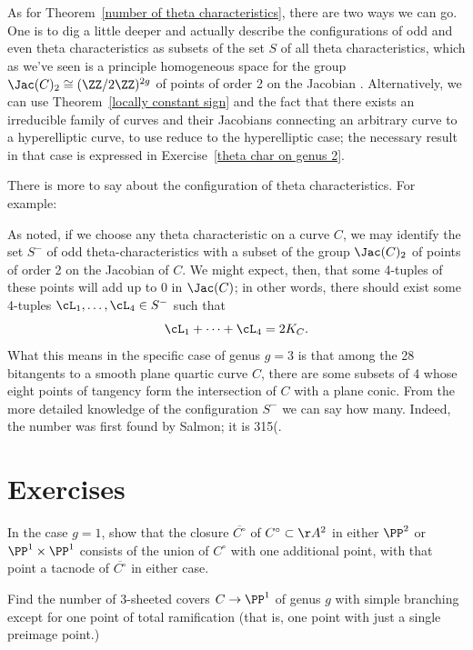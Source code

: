 As for Theorem~\ref{number of theta characteristics}, there are two ways we can go. One is to dig a little deeper and actually describe the configurations of odd and even theta characteristics as subsets of the set $S$ of all theta characteristics, which as we've seen is a principle homogeneous space for the group $\Jac(C)_2 \cong (\ZZ/2\ZZ)^{2g}$ of points of order 2 on the Jacobian . Alternatively, we can use
Theorem~\ref{locally constant sign} and the fact that there exists an irreducible family of 
curves and their Jacobians connecting an arbitrary curve to a hyperelliptic curve, to use reduce to the hyperelliptic case; the necessary result in that case is expressed in
Exercise~\ref{theta char on genus 2}.

There is more to say about the configuration of theta characteristics. For example:
\begin{fact}
 As noted, if we choose any theta characteristic on a curve $C$, we may identify the set $S^-$ of odd theta-characteristics with a subset of the group $\Jac(C)_2$ of points of order 2 on the Jacobian of $C$. We might expect, then, that some 4-tuples of these points will add up to 0 in $\Jac(C)$; in other words, there should exist some 4-tuples $\cL_1,\dots,\cL_4 \in S^-$ such that
$$
\cL_1+ \dots +\cL_4 = 2K_C.
$$
What this means in the specific case of genus $g=3$ is that among the 28 bitangents to a smooth plane quartic curve $C$, there are some subsets of 4 whose eight points of tangency form the intersection of $C$ with a plane conic. From the more detailed knowledge of the configuration $S^-$ we can say how many. Indeed, the number was first found by Salmon; it is 315(\cite{Salmon}.
\end{fact}

\section{Exercises}
 \begin{exercise}
  In the case $g=1$, show that the closure $\overline{C^\circ}$ of $C^\circ \subset \AA^2$ in either $\PP^2$ or $\PP^1 \times \PP^1$ consists of the union of $C^\circ$ with one additional point, with that point a tacnode of $\overline{C^\circ}$ in either case.
  \end{exercise}

\begin{exercise}
Find the number of 3-sheeted covers $C \to \PP^1$ of genus $g$ with simple branching except for one point of total ramification (that is, one point with just a single preimage point.)
\end{exercise}

